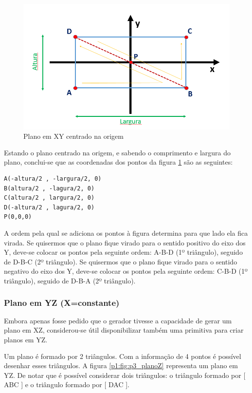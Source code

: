 \begin{figure}[<+htpb+>]
	\centering
	\includegraphics[scale=0.5]{imagens/p3_planoY.png}
	\caption{Plano em XY centrado na origem}
	\label{p1:fig:p3_planoY}
\end{figure}

Estando o plano centrado na origem, e sabendo o comprimento e largura do plano, conclui-se que as coordenadas dos pontos da figura \ref{p1:fig:p3_planoY} são as seguintes:

\begin{Verbatim}
A(-altura/2 , -largura/2, 0)
B(altura/2 , -lagura/2, 0)
C(altura/2 , largura/2, 0)
D(-altura/2 , lagura/2, 0)
P(0,0,0)
\end{Verbatim}



A ordem pela qual se adiciona os pontos à figura determina para que lado ela fica virada. Se quisermos que o plano fique virado para o sentido positivo do eixo dos Y, deve-se colocar os pontos pela seguinte ordem: A-B-D (1º triângulo), seguido de D-B-C (2º triângulo). Se quisermos que o plano fique virado para o sentido negativo do eixo dos Y, deve-se colocar os pontos pela seguinte ordem: C-B-D (1º triângulo), seguido de D-B-A (2º triângulo).


\subsubsection{Plano em YZ (X=constante)}

Embora apenas fosse pedido que o gerador tivesse a capacidade de gerar um plano em XZ, considerou-se útil disponibilizar também uma primitiva para criar planos em YZ.

Um plano é formado por 2 triângulos. Com a informação de 4 pontos é possível desenhar esses triângulos. A figura \ref{p1:fig:p3_planoZ} representa um plano em YZ. De notar que é possível considerar dois triângulos: o triângulo formado por [ ABC ] e o triângulo formado por [ DAC ].

